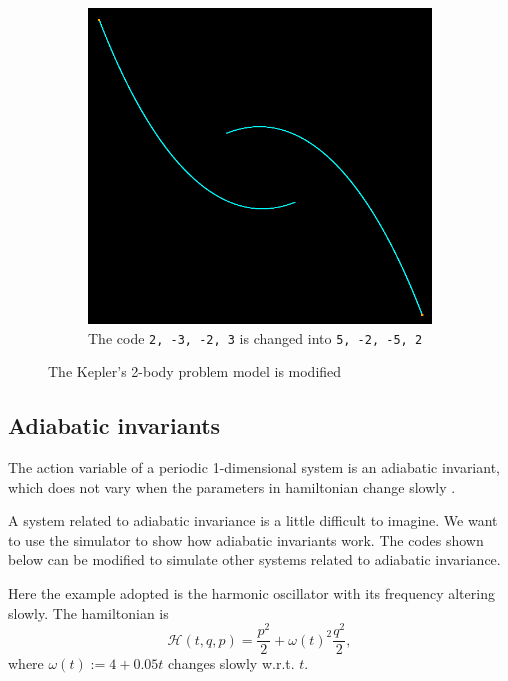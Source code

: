 \documentclass[12pt]{article}
\begin{document}
\begin{figure}[h]
\begin{subfigure}[b]{0.6\linewidth}
    \includegraphics[width=\linewidth]{distortion3_kepler.png}
    \caption{The code \texttt{2, -3, -2, 3} is changed into \texttt{5, -2, -5, 2}}
  \end{subfigure}
  \caption{The Kepler's 2-body problem model is modified}
  \label{fig:distortion_kepler}
\end{figure}

\subsection{Adiabatic invariants}

The action variable of a periodic 1-dimensional system is an adiabatic invariant,
which does not vary when the parameters in hamiltonian change slowly \cite[p. 298]{arnold1989mathmech}\cite[p. 156]{landau1976mechanics}.

A system related to adiabatic invariance is a little difficult to imagine.
We want to use the simulator to show how adiabatic invariants work.
The codes shown below can be modified to simulate other systems related to adiabatic invariance.

Here the example adopted is the harmonic oscillator with its frequency altering slowly.
The hamiltonian is
\begin{equation*}
  \mathcal H\left(t,q,p\right)=\frac{p^2}2+\omega\left(t\right)^2\frac{q^2}2,
\end{equation*}
where $\omega\left(t\right):=4+0.05t$ changes slowly w.r.t. $t$.
\end{document}
